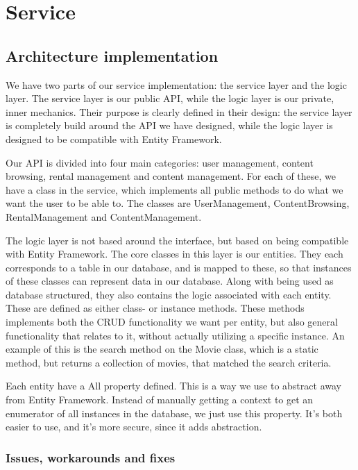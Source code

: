 \section{Service}
\label{Implementation_Service}

\subsection[Architecture]{Architecture implementation}
\label{Implementation_Service_Architecture}

We have two parts of our service implementation: the service layer and the logic layer. The service layer is our public API, while the logic layer is our private, inner mechanics. Their purpose is clearly defined in their design: the service layer is completely build around the API we have designed, while the logic layer is designed to be compatible with Entity Framework. 

Our API is divided into four main categories: user management, content browsing, rental management and content management. For each of these, we have a class in the service, which implements all public methods to do what we want the user to be able to. The classes are UserManagement, ContentBrowsing, RentalManagement and ContentManagement. 

The logic layer is not based around the interface, but based on being compatible with Entity Framework. The core classes in this layer is our entities. They each corresponds to a table in our database, and is mapped to these, so that instances of these classes can represent data in our database. Along with being used as database structured, they also contains the logic associated with each entity. These are defined as either class- or instance methods. These methods implements both the CRUD functionality we want per entity, but also general functionality that relates to it, without actually utilizing a specific instance. An example of this is the search method on the Movie class, which is a static method, but returns a collection of movies, that matched the search criteria. 

Each entity have a All property defined. This is a way we use to abstract away from Entity Framework. Instead of manually getting a context to get an enumerator of all instances in the database, we just use this property. It's both easier to use, and it's more secure, since it adds abstraction.

\subsubsection{Issues, workarounds and fixes}
\label{Implementation_Service_Architecture_Issues}

